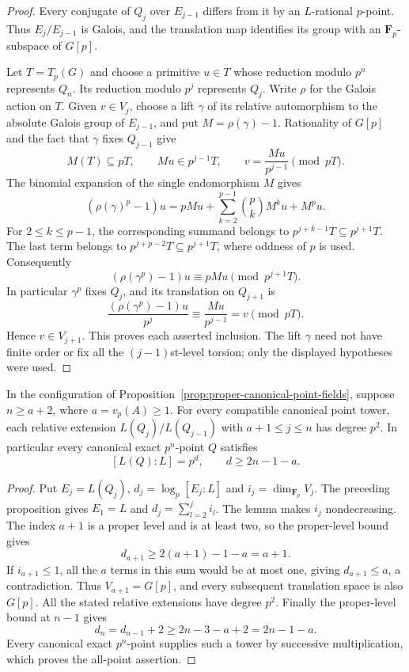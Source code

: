 \begin{proof}
Every conjugate of $Q_j$ over $E_{j-1}$ differs from it by an
$L$-rational $p$-point. Thus $E_j/E_{j-1}$ is Galois, and the
translation map identifies its group with an $\mathbf F_p$-subspace
of $G[p]$.

Let $T=T_p(G)$ and choose a primitive $u\in T$ whose reduction
modulo $p^n$ represents $Q_n$. Its reduction modulo $p^j$ represents
$Q_j$. Write $\rho$ for the Galois action on $T$. Given
$v\in V_j$, choose a lift $\gamma$ of its relative automorphism
to the absolute Galois group of $E_{j-1}$, and put
$M=\rho(\gamma)-1$. Rationality of $G[p]$ and the fact that
$\gamma$ fixes $Q_{j-1}$ give
\[
 M(T)\subseteq pT,\qquad Mu\in p^{j-1}T,
 \qquad v=\frac{Mu}{p^{j-1}}\pmod{pT}.
\]
The binomial expansion of the single endomorphism $M$ gives
\[
 (\rho(\gamma)^p-1)u
 =pMu+\sum_{k=2}^{p-1}\binom pk M^ku+M^pu.
\]
For $2\le k\le p-1$, the corresponding summand belongs to
$p^{j+k-1}T\subseteq p^{j+1}T$. The last term belongs to
$p^{j+p-2}T\subseteq p^{j+1}T$, where oddness of $p$ is used.
Consequently
\[
 (\rho(\gamma^p)-1)u\equiv pMu\pmod{p^{j+1}T}.
\]
In particular $\gamma^p$ fixes $Q_j$, and its translation on
$Q_{j+1}$ is
\[
 \frac{(\rho(\gamma^p)-1)u}{p^j}
 \equiv\frac{Mu}{p^{j-1}}=v\pmod{pT}.
\]
Hence $v\in V_{j+1}$. This proves each asserted inclusion.
The lift $\gamma$ need not have finite order or fix all the
$(j-1)$st-level torsion; only the displayed hypotheses were used.
\end{proof}

\begin{corollary}\label{cor:proper-point-field-full-steps}
In the configuration of Proposition~\ref{prop:proper-canonical-point-fields},
suppose $n\ge a+2$, where $a=v_p(A)\ge1$.
For every compatible canonical point tower, each relative extension
$L(Q_j)/L(Q_{j-1})$ with $a+1\le j\le n$ has degree $p^2$.
In particular every canonical exact $p^n$-point $Q$ satisfies
\[
 [L(Q):L]=p^d,\qquad d\ge2n-1-a.
\]
\end{corollary}

\begin{proof}
Put $E_j=L(Q_j)$, $d_j=\log_p[E_j:L]$ and $i_j=\dim_{\mathbf F_p}V_j$.
The preceding proposition gives $E_1=L$ and
$d_j=\sum_{l=2}^j i_l$. The lemma makes $i_j$ nondecreasing.
The index $a+1$ is a proper level and is at least two, so the
proper-level bound gives
\[
 d_{a+1}\ge2(a+1)-1-a=a+1.
\]
If $i_{a+1}\le1$, all the $a$ terms in this sum would be at most
one, giving $d_{a+1}\le a$, a contradiction. Thus
$V_{a+1}=G[p]$, and every subsequent translation space is also
$G[p]$. All the stated relative extensions have degree $p^2$.
Finally the proper-level bound at $n-1$ gives
\[
 d_n=d_{n-1}+2\ge2n-3-a+2=2n-1-a.
\]
Every canonical exact $p^n$-point supplies such a tower by
successive multiplication, which proves the all-point assertion.
\end{proof}

